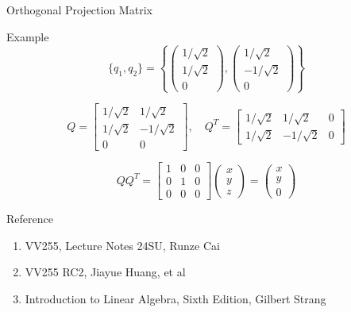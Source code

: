 \documentclass[aspectratio=169, UTF8]{ctexbeamer}
\begin{document}
\begin{frame}{Orthogonal Projection Matrix}
    \begin{block}{Example}
        $$
            \{q_1, q_2\} = \left\{
            \begin{pmatrix} 1/\sqrt{2} \\ 1/\sqrt{2} \\ 0 \end{pmatrix},
            \begin{pmatrix} 1/\sqrt{2} \\ -1/\sqrt{2} \\ 0 \end{pmatrix}
            \right\}
        $$

        $$
            Q = \begin{bmatrix}
                1/\sqrt{2} & 1/\sqrt{2}  \\
                1/\sqrt{2} & -1/\sqrt{2} \\
                0          & 0
            \end{bmatrix}, \quad
            Q^T = \begin{bmatrix}
                1/\sqrt{2} & 1/\sqrt{2}  & 0 \\
                1/\sqrt{2} & -1/\sqrt{2} & 0
            \end{bmatrix}
        $$

        $$
            QQ^T = \begin{bmatrix}
                1 & 0 & 0 \\
                0 & 1 & 0 \\
                0 & 0 & 0
            \end{bmatrix}
            \begin{pmatrix} x \\ y \\ z \end{pmatrix}
            =
            \begin{pmatrix} x \\ y \\ 0 \end{pmatrix}
        $$
    \end{block}

\end{frame}


\begin{frame}{Reference}
    \begin{enumerate}
        \item VV255, Lecture Notes 24SU, Runze Cai
        \item VV255 RC2, Jiayue Huang, et al
        \item Introduction to Linear Algebra, Sixth Edition, Gilbert Strang
    \end{enumerate}
\end{frame}

\end{document}
